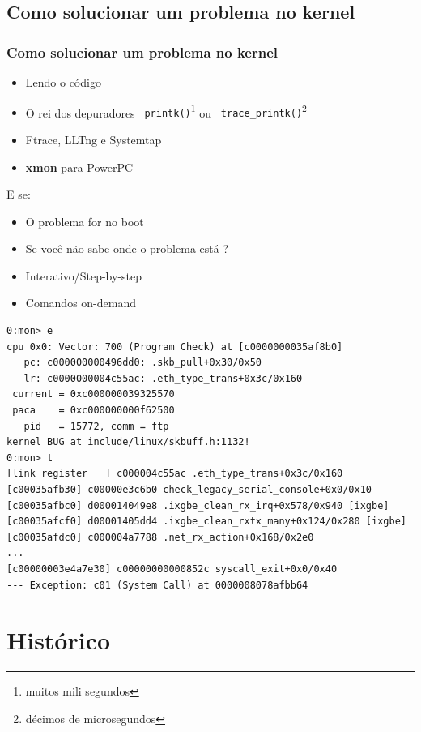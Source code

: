 \documentclass[xcolor=pdftex,dvipsnames,table]{beamer}
\begin{document}
\subsection{Como solucionar um problema no kernel}
\begin{frame}
       \frametitle{Como solucionar um problema no kernel}

       \begin{itemize}
               \item Lendo o código
               \item O rei dos depuradores {\tt
printk()}\footnote{muitos mili segundos} ou {\tt
trace\_printk()}\footnote{décimos de microsegundos}
               \item Ftrace, LLTng e Systemtap
               \item {\bf xmon} para PowerPC
       \end{itemize}
       \alert{ E se: }
       \begin{itemize}
               \item O problema for no boot
               \item Se você não sabe onde o problema está ?
               \item Interativo/Step-by-step
               \item Comandos on-demand
       \end{itemize}
\end{frame}

\begin{frame}[containsverbatim]
\footnotesize
\begin{verbatim}
0:mon> e
cpu 0x0: Vector: 700 (Program Check) at [c0000000035af8b0]
   pc: c000000000496dd0: .skb_pull+0x30/0x50
   lr: c0000000004c55ac: .eth_type_trans+0x3c/0x160
 current = 0xc000000039325570
 paca    = 0xc000000000f62500
   pid   = 15772, comm = ftp
kernel BUG at include/linux/skbuff.h:1132!
0:mon> t
[link register   ] c000004c55ac .eth_type_trans+0x3c/0x160
[c00035afb30] c00000e3c6b0 check_legacy_serial_console+0x0/0x10
[c00035afbc0] d000014049e8 .ixgbe_clean_rx_irq+0x578/0x940 [ixgbe]
[c00035afcf0] d00001405dd4 .ixgbe_clean_rxtx_many+0x124/0x280 [ixgbe]
[c00035afdc0] c000004a7788 .net_rx_action+0x168/0x2e0
...
[c00000003e4a7e30] c00000000000852c syscall_exit+0x0/0x40
--- Exception: c01 (System Call) at 0000008078afbb64
\end{verbatim}
\end{frame}

\section{Histórico}
\end{document}
